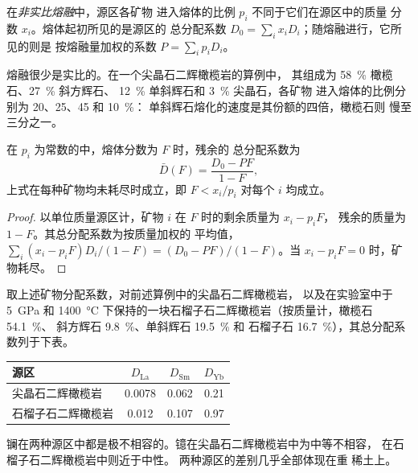 \begin{definition}[非实比熔融]\label{def:b3:trace-element-modelling:nonmodal}
在\emph{非实比熔融}中，源区各矿物
进入熔体的比例 $p_i$ 不同于它们在源区中的质量
分数 $x_i$。熔体起初所见的是源区的
总分配系数 $D_0 = \sum_i x_iD_i$；随熔融进行，它所见的则是
按熔融量加权的系数 $P = \sum_i p_iD_i$。
\end{definition}

熔融很少是实比的。在一个尖晶石二辉橄榄岩的算例中，
其组成为 \qty{58}{\percent} 橄榄石、\qty{27}{\percent} 斜方辉石、
\qty{12}{\percent} 单斜辉石和 \qty{3}{\percent} 尖晶石，各矿物
进入熔体的比例分别为 20、25、45 和 \qty{10}{\percent}：
单斜辉石熔化的速度是其份额的四倍，橄榄石则
慢至三分之一。

\begin{proposition}[残余的总分配系数]
\label{prop:b3:trace-element-modelling:residue}
在 $p_i$ 为常数的中，熔体分数为 $F$ 时，残余的
总分配系数为
\[
\bar D(F) = \frac{D_0 - PF}{1 - F},
\]
上式在每种矿物均未耗尽时成立，即 $F < x_i/p_i$ 对每个 $i$ 均成立。
\end{proposition}

\begin{proof}
以单位质量源区计，矿物 $i$ 在 $F$ 时的剩余质量为 $x_i - p_iF$，
残余的质量为 $1 - F$。其总分配系数为按质量加权的
平均值，$\sum_i (x_i - p_iF)D_i/(1 - F) = (D_0 - PF)/(1 - F)$。当
$x_i - p_iF = 0$ 时，矿物耗尽。
\end{proof}

取上述矿物分配系数，对前述算例中的尖晶石二辉橄榄岩，
以及在实验室中于 \qty{5}{GPa} 和
\qty{1400}{\celsius} 下保持的一块石榴子石二辉橄榄岩（按质量计，橄榄石 \qty{54.1}{\percent}、
斜方辉石 \qty{9.8}{\percent}、单斜辉石 \qty{19.5}{\percent} 和
石榴子石 \qty{16.7}{\percent}），其总分配系数列于下表。
\begin{center}
\small
\begin{tabular}{lccc}
\hline
源区 & $D_{\mathrm{La}}$ & $D_{\mathrm{Sm}}$ & $D_{\mathrm{Yb}}$ \\
\hline
尖晶石二辉橄榄岩 & 0.0078 & 0.062 & 0.21 \\
石榴子石二辉橄榄岩 & 0.012 & 0.107 & 0.97 \\
\hline
\end{tabular}
\end{center}
镧在两种源区中都是极不相容的。镱在尖晶石二辉橄榄岩中为中等不相容，
在石榴子石二辉橄榄岩中则近于中性。
两种源区的差别几乎全部体现在重
稀土上。


